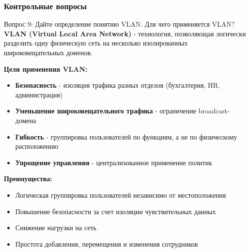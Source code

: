 \begin{frame}
\frametitle{Контрольные вопросы}
\begin{block}{Вопрос 9: Дайте определение понятию VLAN. Для чего применяется VLAN?}
\textbf{VLAN (Virtual Local Area Network)} - технология, позволяющая логически разделить одну физическую сеть на несколько изолированных широковещательных доменов.
\vspace{0.2cm}

\textbf{Цели применения VLAN:}
\begin{itemize}
    \item \textbf{Безопасность} - изоляция трафика разных отделов (бухгалтерия, HR, администрация)
    \item \textbf{Уменьшение широковещательного трафика} - ограничение broadcast-домена
    \item \textbf{Гибкость} - группировка пользователей по функциям, а не по физическому расположению
    \item \textbf{Упрощение управления} - централизованное применение политик
\end{itemize}

\textbf{Преимущества:}
\begin{itemize}
    \item Логическая группировка пользователей независимо от местоположения
    \item Повышение безопасности за счет изоляции чувствительных данных
    \item Снижение нагрузки на сеть
    \item Простота добавления, перемещения и изменения сотрудников
\end{itemize}
\end{block}
\end{frame}

